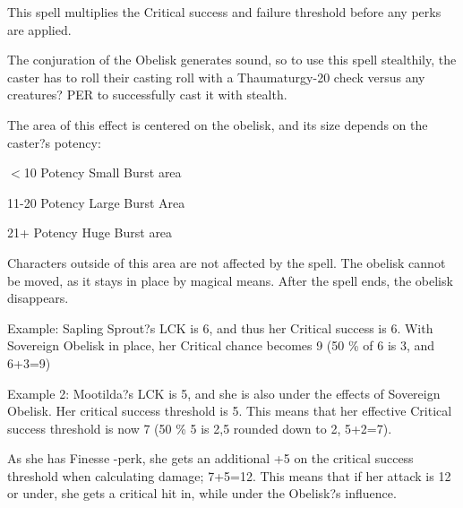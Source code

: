 \documentclass[11pt,a4paper,twocolumn]{book}
\begin{document}
	This spell multiplies the Critical success and failure threshold before any perks are applied.
	
	The conjuration of the Obelisk generates sound, so to use this spell stealthily, the caster has to roll their casting roll with a Thaumaturgy-20 check versus any creatures? PER to successfully cast it with stealth.
	
	The area of this effect is centered on the obelisk, and its size depends on the caster?s potency:
	
	\begin{compactitem}
		\item $<$10 Potency 		Small Burst area
		\item 11-20 Potency 		Large Burst Area
		\item 21+ Potency 			Huge Burst area
	\end{compactitem}
	
	
	Characters outside of this area are not affected by the spell. The obelisk cannot be moved, as it stays in place by magical means. After the spell ends, the obelisk disappears.
	
	\medskip
	
	Example: Sapling Sprout?s LCK is 6, and thus her Critical success is 6. With Sovereign Obelisk in place, her Critical chance becomes 9 (50 \% of 6 is 3, and 6+3=9)
	
	Example 2: Mootilda?s LCK is 5, and she is also under the effects of Sovereign Obelisk. Her critical success threshold is 5. This means that her effective Critical success threshold is now 7 (50 \% 5 is 2,5 rounded down to 2, 5+2=7). 
	
	As she has Finesse -perk, she gets an additional +5 on the critical success threshold when calculating damage; 7+5=12. This means that if her attack is 12 or under, she gets a critical hit in, while under the Obelisk?s influence.
	
	
	
	
	
	
	
	
   
\end{document}
